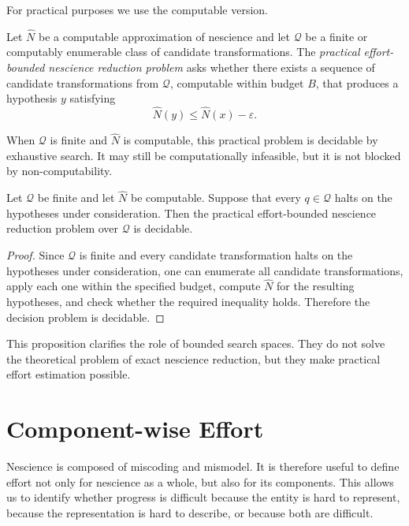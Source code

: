 For practical purposes we use the computable version.

\begin{definition}
Let \(\widehat{N}\) be a computable approximation of nescience and let \(\mathcal{Q}\) be a finite or computably enumerable class of candidate transformations. The \emph{practical effort-bounded nescience reduction problem} asks whether there exists a sequence of candidate transformations from \(\mathcal{Q}\), computable within budget \(B\), that produces a hypothesis \(y\) satisfying
\[
\widehat{N}(y)\leq \widehat{N}(x)-\varepsilon.
\]
\end{definition}

When \(\mathcal{Q}\) is finite and \(\widehat{N}\) is computable, this practical problem is decidable by exhaustive search. It may still be computationally infeasible, but it is not blocked by non-computability.

\begin{proposition}
Let \(\mathcal{Q}\) be finite and let \(\widehat{N}\) be computable. Suppose that every \(q\in\mathcal{Q}\) halts on the hypotheses under consideration. Then the practical effort-bounded nescience reduction problem over \(\mathcal{Q}\) is decidable.
\end{proposition}

\begin{proof}
Since \(\mathcal{Q}\) is finite and every candidate transformation halts on the hypotheses under consideration, one can enumerate all candidate transformations, apply each one within the specified budget, compute \(\widehat{N}\) for the resulting hypotheses, and check whether the required inequality holds. Therefore the decision problem is decidable.
\end{proof}

This proposition clarifies the role of bounded search spaces. They do not solve the theoretical problem of exact nescience reduction, but they make practical effort estimation possible.

\section{Component-wise Effort}
\label{sec:componentwise_effort}

Nescience is composed of miscoding and mismodel. It is therefore useful to define effort not only for nescience as a whole, but also for its components. This allows us to identify whether progress is difficult because the entity is hard to represent, because the representation is hard to describe, or because both are difficult.

